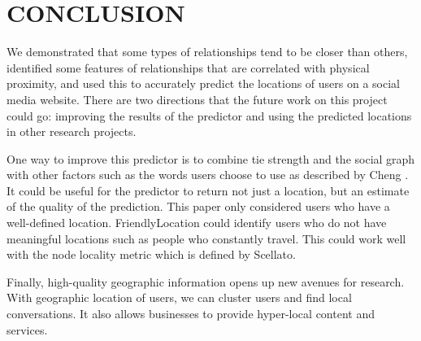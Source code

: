 \chapter{\uppercase{Conclusion}}
We demonstrated that some types of relationships tend to be closer than others,
identified some features of relationships that are correlated with physical
proximity, and used this to accurately predict the locations of users on a
social media website.
There are two directions that the future work on this project could go:
improving the results of the predictor and using the predicted locations in
other research projects.

One way to improve this predictor is to combine tie strength and the social
graph with other factors such as the words users choose to use as described by
Cheng \cite{cheng2010you}.
It could be useful for the predictor to return not just a location, but an
estimate of the quality of the prediction.  This paper only considered
users who have a well-defined location. FriendlyLocation could identify users
who do not have meaningful locations such as people who constantly travel.
This could work well with the node locality metric which is defined by
Scellato\cite{scellato2010distance}.

Finally, high-quality geographic information opens up new avenues for research.
With geographic location of users, we can cluster users and find local
conversations.
It also allows businesses to provide hyper-local content and services.


